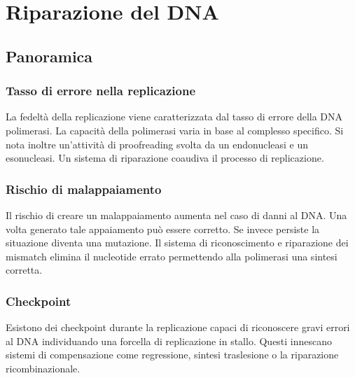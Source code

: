 \chapter{Riparazione del DNA}

\section{Panoramica}

	\subsection{Tasso di errore nella replicazione}
	La fedelt\`a della replicazione viene caratterizzata dal tasso di errore della DNA polimerasi.
	La capacit\`a della polimerasi varia in base al complesso specifico.
	Si nota inoltre un'attivit\`a di proofreading svolta da un endonucleasi e un esonucleasi.
	Un sistema di riparazione coaudiva il processo di replicazione.

	\subsection{Rischio di malappaiamento}
	Il rischio di creare un malappaiamento aumenta nel caso di danni al DNA.
	Una volta generato tale appaiamento pu\`o essere corretto.
	Se invece persiste la situazione diventa una mutazione.
	Il sistema di riconoscimento e riparazione dei mismatch elimina il nucleotide errato permettendo alla polimerasi una sintesi corretta.

	\subsection{Checkpoint}
	Esistono dei checkpoint durante la replicazione capaci di riconoscere gravi errori al DNA individuando una forcella di replicazione in stallo.
	Questi innescano sistemi di compensazione come regressione, sintesi traslesione o la riparazione ricombinazionale.

